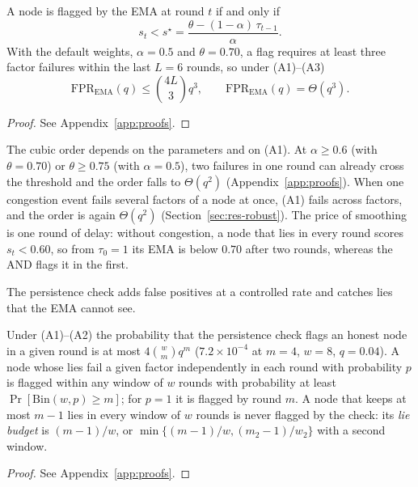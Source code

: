 \begin{proposition}\label{prop:fpr_ema}
A node is flagged by the EMA at round $t$ if and only if
\begin{equation}
s_t < s^{\star}=\frac{\theta-(1-\alpha)\,\tau_{t-1}}{\alpha}.
\label{eq:sstar}
\end{equation}
With the default weights, $\alpha=0.5$ and $\theta=0.70$, a flag
requires at least three factor failures within the last $L=6$ rounds,
so under (A1)--(A3)
\begin{equation}
\mathrm{FPR}_{\mathrm{EMA}}(q) \le \binom{4L}{3}q^{3},\qquad
\mathrm{FPR}_{\mathrm{EMA}}(q)=\Theta(q^{3}).
\end{equation}
\end{proposition}
\begin{proof}
See Appendix~\ref{app:proofs}.
\end{proof}

The cubic order depends on the parameters and on (A1).  At
$\alpha\geq0.6$ (with $\theta=0.70$) or $\theta\geq0.75$ (with
$\alpha=0.5$), two failures in one round can already cross the
threshold and the order falls to $\Theta(q^{2})$
(Appendix~\ref{app:proofs}).  When one congestion event fails several
factors of a node at once, (A1) fails across factors, and the order is
again $\Theta(q^{2})$ (Section~\ref{sec:res-robust}).  The price of
smoothing is one round of delay: without congestion, a node that lies
in every round scores $s_t<0.60$, so from $\tau_0=1$ its EMA is below
$0.70$ after two rounds, whereas the AND flags it in the first.

The persistence check adds false positives at a controlled rate and
catches lies that the EMA cannot see.

\begin{proposition}\label{prop:persist}
Under (A1)--(A2) the probability that the persistence check flags an
honest node in a given round is at most
$4\binom{w}{m}q^{m}$ ($7.2\times10^{-4}$ at $m=4$, $w=8$, $q=0.04$).
A node whose lies fail a given factor independently in each round with
probability $p$ is flagged within any window of $w$ rounds with
probability at least $\Pr[\mathrm{Bin}(w,p)\geq m]$; for $p=1$ it is
flagged by round $m$.  A node that keeps at most $m-1$ lies in every
window of $w$ rounds is never flagged by the check: its \emph{lie
budget} is $(m-1)/w$, or $\min\{(m-1)/w,(m_2-1)/w_2\}$ with a second
window.
\end{proposition}
\begin{proof}
See Appendix~\ref{app:proofs}.
\end{proof}

